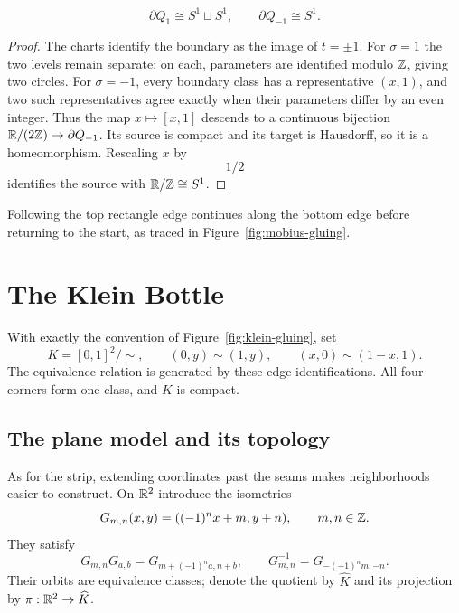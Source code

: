 \begin{proposition}
\[
\partial Q_1\cong S^1\sqcup S^1,\qquad \partial Q_{-1}\cong S^1.
\]
\end{proposition}
\begin{proof}
The charts identify the boundary as the image of $t=\pm1$.
For $\sigma=1$ the two levels remain separate; on each, parameters are
identified modulo $\mathbb{Z}$, giving two circles. For $\sigma=-1$, every boundary
class has a representative $(x,1)$, and two such representatives agree
exactly when their parameters differ by an even integer. Thus the map
$x\mapsto[x,1]$ descends to a continuous bijection
$\mathbb{R}/(2\mathbb{Z})\to\partial Q_{-1}$. Its source is compact and its target is
Hausdorff, so it is a homeomorphism. Rescaling $x$ by
\[
1/2
\]
 identifies the
source with $\mathbb{R}/\mathbb{Z}\cong S^1$.
\end{proof}
Following the top rectangle edge continues along the bottom edge before
returning to the start, as traced in Figure~\ref{fig:mobius-gluing}.

\section{The Klein Bottle}\label{sec:quotient-klein}
\begin{definition}
With exactly the convention of Figure~\ref{fig:klein-gluing}, set
\[
K=[0,1]^2/{\sim},\qquad(0,y)\sim(1,y),\qquad(x,0)\sim(1-x,1).
\]
The equivalence relation is generated by these edge identifications.
All four corners form one class, and $K$ is compact.
\end{definition}

\FloatBarrier

\subsection{The plane model and its topology}
As for the strip, extending coordinates past the seams makes neighborhoods
easier to construct. On $\mathbb{R}^2$ introduce the isometries
\[
G_{m,n}(x,y)=((-1)^n x+m,y+n),\qquad m,n\in\mathbb{Z}.
\]
They satisfy
\[
G_{m,n}G_{a,b}=G_{m+(-1)^na,n+b},\qquad
G_{m,n}^{-1}=G_{-(-1)^nm,-n}.
\]
Their orbits are equivalence classes; denote the quotient by $\widehat K$
and its projection by $\pi:\mathbb{R}^2\to\widehat K$.

